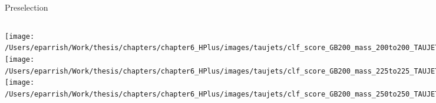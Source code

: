 \documentclass[aspectratio=169,xcolor=table]{beamer}
\begin{document}
    \begin{frame}[t]{\taujets Preselection}
      \begin{columns}[t]
          \texttt{[image: /Users/eparrish/Work/thesis/chapters/chapter6\_HPlus/images/taujets/clf\_score\_GB200\_mass\_200to200\_TAUJET\_PRESEL.png]}
          \texttt{[image: /Users/eparrish/Work/thesis/chapters/chapter6\_HPlus/images/taujets/clf\_score\_GB200\_mass\_225to225\_TAUJET\_PRESEL.png]}
          \texttt{[image: /Users/eparrish/Work/thesis/chapters/chapter6\_HPlus/images/taujets/clf\_score\_GB200\_mass\_250to250\_TAUJET\_PRESEL.png]}

          \texttt{[image: /Users/eparrish/Work/thesis/chapters/chapter6\_HPlus/images/taujets/clf\_score\_GB200\_mass\_275to275\_TAUJET\_PRESEL.png]}
          \texttt{[image: /Users/eparrish/Work/thesis/chapters/chapter6\_HPlus/images/taujets/clf\_score\_GB200\_mass\_300to300\_TAUJET\_PRESEL.png]}
          \texttt{[image: /Users/eparrish/Work/thesis/chapters/chapter6\_HPlus/images/taujets/clf\_score\_GB200\_mass\_350to350\_TAUJET\_PRESEL.png]}

          \texttt{[image: /Users/eparrish/Work/thesis/chapters/chapter6\_HPlus/images/taujets/clf\_score\_GB200\_mass\_400to400\_TAUJET\_PRESEL.png]}
          \texttt{[image: /Users/eparrish/Work/thesis/chapters/chapter6\_HPlus/images/taujets/clf\_score\_GB200\_mass\_500to500\_TAUJET\_PRESEL.png]}
          \texttt{[image: /Users/eparrish/Work/thesis/chapters/chapter6\_HPlus/images/taujets/clf\_score\_GB200\_mass\_600to600\_TAUJET\_PRESEL.png]}

          \texttt{[image: /Users/eparrish/Work/thesis/chapters/chapter6\_HPlus/images/taujets/clf\_score\_GB200\_mass\_700to700\_TAUJET\_PRESEL.png]}
          \texttt{[image: /Users/eparrish/Work/thesis/chapters/chapter6\_HPlus/images/taujets/clf\_score\_GB200\_mass\_800to800\_TAUJET\_PRESEL.png]}
          \texttt{[image: /Users/eparrish/Work/thesis/chapters/chapter6\_HPlus/images/taujets/clf\_score\_GB200\_mass\_900to900\_TAUJET\_PRESEL.png]}

      \end{columns}
    \end{frame}
\end{document}

